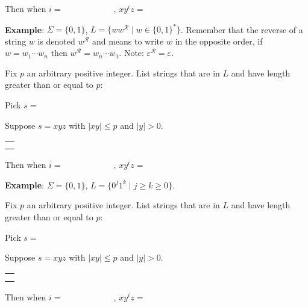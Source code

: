 \documentclass[12pt, oneside]{article}
\begin{document}
Then when $i = \hspace{1in}$, $xy^i z  = \hspace{1in}$

\newpage

{\bf Example}: $\Sigma  =  \{0,1\}$, $L = \{w w^{\mathcal{R}} \mid w \in \{0,1\}^*\}$.
Remember that the reverse of a string $w$ is denoted $w^\mathcal{R}$  
and means to write $w$  in  the opposite order, if $w = w_1 \cdots  w_n$ then $w^\mathcal{R} = w_n \cdots  w_1$. Note: $\varepsilon^\mathcal{R} = \varepsilon$.


Fix $p$ an arbitrary positive integer. List strings that are in $L$ and have length  greater than or equal  to $p$:

\vspace{10pt}

Pick $s = $

Suppose $s = xyz$ with  $|xy|  \leq  p$ and $|y| > 0$.
\begin{center}
\begin{tabular}{|c|}
\hline
 \\
\hspace{4in} \\
\hline
\end{tabular}
\end{center}
Then when $i = \hspace{1in}$, $xy^i z  = \hspace{1in}$


\vspace{30pt} 

{\bf Example}: $\Sigma  =  \{0,1\}$, $L = \{0^j1^k  \mid j \geq k  \geq 0\}$.

Fix $p$ an arbitrary positive integer. List strings that are in $L$ and have length  greater than or equal  to $p$:

\vspace{10pt}

Pick $s = $


Suppose $s = xyz$ with  $|xy|  \leq  p$ and $|y| > 0$.
\begin{center}
\begin{tabular}{|c|}
\hline
 \\
\hspace{4in} \\
\hline
\end{tabular}
\end{center}
Then when $i = \hspace{1in}$, $xy^i z  = \hspace{1in}$
\end{document}
